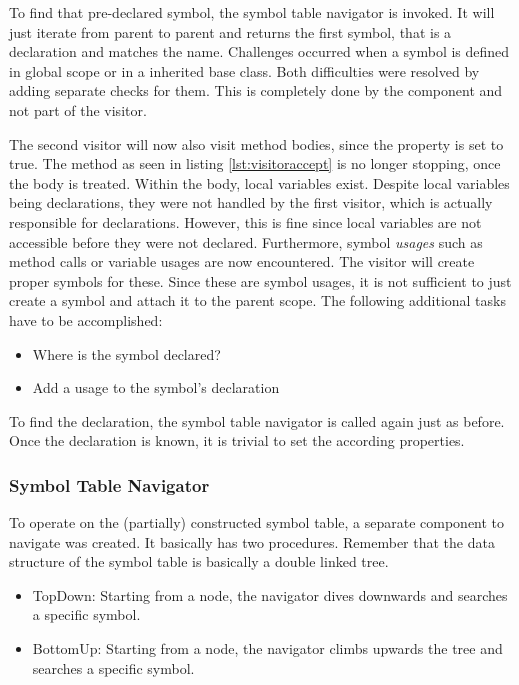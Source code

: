 To find that pre-declared symbol, the symbol table navigator is invoked.
It will just iterate from parent to parent and returns the first symbol, that is a declaration and matches the name.
Challenges occurred when a symbol is defined in global scope or in a inherited base class.
Both difficulties were resolved by adding separate checks for them.
This is completely done by the  component and not part of the visitor.

The second visitor will now also visit method bodies, since the  property is set to true.
The  method as seen in listing \ref{lst:visitoraccept} is no longer stopping, once the body is treated.
Within the body, local variables exist.
Despite local variables being declarations, they were not handled by the first visitor, which is actually responsible for declarations.
However, this is fine since local variables are not accessible before they were not declared.
Furthermore, symbol \textit{usages} such as method calls or variable usages are now encountered.
The visitor will create proper symbols for these.
Since these are symbol usages, it is not sufficient to just create a symbol and attach it to the parent scope.
The following additional tasks have to be accomplished:
\begin{itemize}
    \item Where is the symbol declared?
    \item Add a usage to the symbol's declaration
\end{itemize}

To find the declaration, the symbol table navigator is called again just as before.
Once the declaration is known, it is trivial to set the according properties.

\subsubsection{Symbol Table Navigator}
To operate on the (partially) constructed symbol table, a separate component to navigate was created.
It basically has two procedures.
Remember that the data structure of the symbol table is basically a double linked tree.

\begin{itemize}
\item TopDown: Starting from a node, the navigator dives downwards and searches a specific symbol.
\item BottomUp: Starting from a node, the navigator climbs upwards the tree and searches a specific symbol.
\end{itemize}

